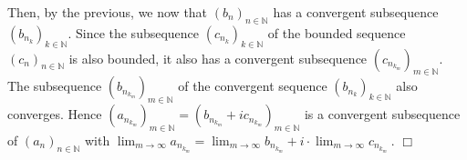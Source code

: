 Then, by the previous, we now that 
$(b_n)_{n\in\mathbb{N}}$ has a convergent subsequence $(b_{n_k})_{k\in\mathbb{N}}$. Since the subsequence $(c_{n_k})_{k\in\mathbb{N}}$ of the bounded sequence $(c_n)_{n\in\mathbb{N}}$
is also bounded, it also has a convergent subsequence $(c_{n_{k_m}})_{m\in\mathbb{N}}$. The subsequence $(b_{n_{k_m}})_{m\in\mathbb{N}}$ of the 
convergent sequence $(b_{n_k})_{k\in\mathbb{N}}$ also converges. Hence $(a_{n_{k_m}})_{m\in\mathbb{N}} = (b_{n_{k_m}}+ic_{n_{k_m}})_{m\in\mathbb{N}}$ 
is a convergent subsequence of $(a_n)_{n\in\mathbb{N}}$ with 
$\lim_{m\rightarrow \infty} a_{n_{k_m}} = \lim_{m\rightarrow \infty} b_{n_{k_m}} + i\cdot  \lim_{m\rightarrow \infty} c_{n_{k_m}} \ .$
\hfill$\Box$
